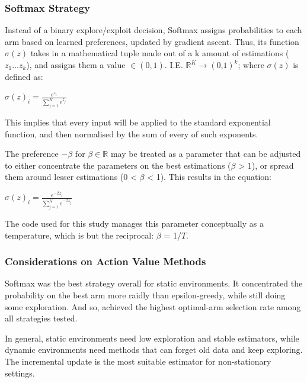 \documentclass[11pt]{article}
\begin{document}
\subsubsection*{Softmax Strategy}

Instead of a binary explore/exploit decision, Softmax assigns probabilities to each arm based on learned preferences, updated by gradient ascent. Thus, its function $\sigma(z)$ takes in a mathematical tuple made out of a k amount of estimations ($z_{1} \ldots z_{k}$), and assigns them a value $\in (0, 1)$. I.E. $\mathbb{R}^{K} \rightarrow (0\text{,}1)^{k}$; where $\sigma(z)$ is defined as:

\bigskip

\begin{center}
  $\sigma(z)_{i} = \frac{e^{z_{i}}}{\sum_{j = 1}^{K} e^{z_{j}} }$
\end{center}

\bigskip

This implies that every input will be applied to the standard exponential function, and then normalised by the sum of every of such exponents.

The preference $ - \beta \text{ for } \beta \in \mathbb{R}$ may be treated as a parameter that can be adjusted to either concentrate the parameters on the best estimations ($\beta$ > 1), or spread them around lesser estimations (0 < $\beta$ < 1). This results in the equation:

\bigskip

\begin{center}
  $\sigma(z)_{i} = \frac{e^{- \beta z_{i}}}{\sum_{j = 1}^{K} e^{- \beta z_{j}} }$
\end{center}

\bigskip

The code used for this study manages this parameter conceptually as a temperature, which is but the reciprocal: $\beta$ = 1/$T$. 

\subsubsection*{Considerations on Action Value Methods}

Softmax was the best strategy overall for static environments. It concentrated the probability on the best arm more raidly than epsilon-greedy, while still doing some exploration. And so, achieved the highest optimal-arm selection rate among all strategies tested.

In general, static environments need low exploration and stable estimators, while dynamic environments need methods that can forget old data and keep exploring. The incremental update is the most suitable estimator for non-stationary settings.
\end{document}
